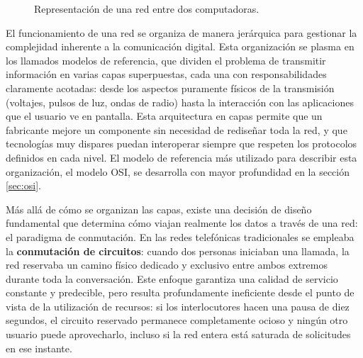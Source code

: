 \documentclass[12pt]{report}
\begin{document}
\begin{figure}[H]
    \centering
    \caption{Representación de una red entre dos computadoras.}
    \label{fig:red_punto_a_punto}
\end{figure}
\newpage

El funcionamiento de una red se organiza de manera jerárquica para gestionar la complejidad inherente a la comunicación digital. Esta organización se plasma en los llamados modelos de referencia, que dividen el problema de transmitir información en varias capas superpuestas, cada una con responsabilidades claramente acotadas: desde 
los aspectos puramente físicos de la transmisión (voltajes, pulsos de luz, ondas de radio) hasta la interacción con las aplicaciones que el usuario ve en pantalla. Esta arquitectura en capas permite que un fabricante mejore un componente sin necesidad de rediseñar toda la red, y que tecnologías muy dispares puedan interoperar siempre 
que respeten los protocolos definidos en cada nivel. El modelo de referencia más utilizado para describir esta organización, el modelo OSI, se desarrolla con mayor profundidad en la sección \ref{sec:osi}.

Más allá de cómo se organizan las capas, existe una decisión de diseño fundamental que determina cómo viajan realmente los datos a través de una red: el paradigma de conmutación. En las redes telefónicas tradicionales se empleaba la \textbf{conmutación de circuitos}: cuando dos personas iniciaban una llamada, la red reservaba un camino 
físico dedicado y exclusivo entre ambos extremos durante toda la conversación. Este enfoque garantiza una calidad de servicio constante y predecible, pero resulta profundamente ineficiente desde el punto de vista de la utilización de recursos: si los interlocutores hacen una pausa de diez segundos, el circuito reservado permanece 
completamente ocioso y ningún otro usuario puede aprovecharlo, incluso si la red entera está saturada de solicitudes en ese instante.
\end{document}
